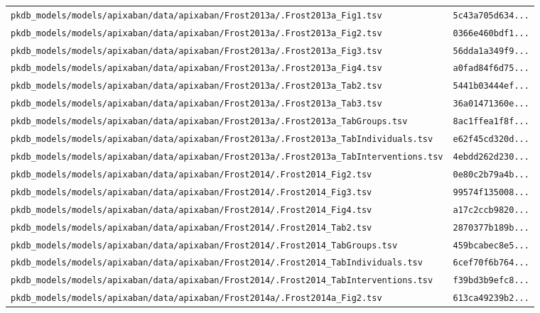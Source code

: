 \begin{longtable}{ll}
\texttt{pkdb\_models/models/apixaban/data/apixaban/Frost2013a/.Frost2013a\_Fig1.tsv} & \texttt{5c43a705d634...} \\
\texttt{pkdb\_models/models/apixaban/data/apixaban/Frost2013a/.Frost2013a\_Fig2.tsv} & \texttt{0366e460bdf1...} \\
\texttt{pkdb\_models/models/apixaban/data/apixaban/Frost2013a/.Frost2013a\_Fig3.tsv} & \texttt{56dda1a349f9...} \\
\texttt{pkdb\_models/models/apixaban/data/apixaban/Frost2013a/.Frost2013a\_Fig4.tsv} & \texttt{a0fad84f6d75...} \\
\texttt{pkdb\_models/models/apixaban/data/apixaban/Frost2013a/.Frost2013a\_Tab2.tsv} & \texttt{5441b03444ef...} \\
\texttt{pkdb\_models/models/apixaban/data/apixaban/Frost2013a/.Frost2013a\_Tab3.tsv} & \texttt{36a01471360e...} \\
\texttt{pkdb\_models/models/apixaban/data/apixaban/Frost2013a/.Frost2013a\_TabGroups.tsv} & \texttt{8ac1ffea1f8f...} \\
\texttt{pkdb\_models/models/apixaban/data/apixaban/Frost2013a/.Frost2013a\_TabIndividuals.tsv} & \texttt{e62f45cd320d...} \\
\texttt{pkdb\_models/models/apixaban/data/apixaban/Frost2013a/.Frost2013a\_TabInterventions.tsv} & \texttt{4ebdd262d230...} \\
\texttt{pkdb\_models/models/apixaban/data/apixaban/Frost2014/.Frost2014\_Fig2.tsv} & \texttt{0e80c2b79a4b...} \\
\texttt{pkdb\_models/models/apixaban/data/apixaban/Frost2014/.Frost2014\_Fig3.tsv} & \texttt{99574f135008...} \\
\texttt{pkdb\_models/models/apixaban/data/apixaban/Frost2014/.Frost2014\_Fig4.tsv} & \texttt{a17c2ccb9820...} \\
\texttt{pkdb\_models/models/apixaban/data/apixaban/Frost2014/.Frost2014\_Tab2.tsv} & \texttt{2870377b189b...} \\
\texttt{pkdb\_models/models/apixaban/data/apixaban/Frost2014/.Frost2014\_TabGroups.tsv} & \texttt{459bcabec8e5...} \\
\texttt{pkdb\_models/models/apixaban/data/apixaban/Frost2014/.Frost2014\_TabIndividuals.tsv} & \texttt{6cef70f6b764...} \\
\texttt{pkdb\_models/models/apixaban/data/apixaban/Frost2014/.Frost2014\_TabInterventions.tsv} & \texttt{f39bd3b9efc8...} \\
\texttt{pkdb\_models/models/apixaban/data/apixaban/Frost2014a/.Frost2014a\_Fig2.tsv} & \texttt{613ca49239b2...} \\

\end{longtable}
